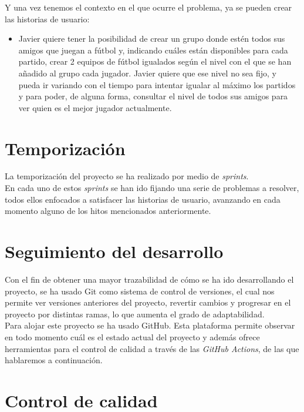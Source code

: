 Y una vez tenemos el contexto en el que ocurre el problema, ya se pueden crear las historias de usuario:

\begin{itemize}
    \item Javier quiere tener la posibilidad de crear un grupo donde estén todos sus amigos que juegan a fútbol y, indicando cuáles están disponibles para cada partido, crear 2
    equipos de fútbol igualados según el nivel con el que se han añadido al grupo cada jugador. Javier quiere que ese nivel no sea fijo, y pueda ir variando con el tiempo para intentar igualar
    al máximo los partidos y para poder, de alguna forma, consultar el nivel de todos sus amigos para ver quien es el mejor jugador actualmente.
\end{itemize}

\newpage
\section{Temporización}

La temporización del proyecto se ha realizado por medio de \textit{sprints}.\\

En cada uno de estos \textit{sprints} se han ido fijando una serie de problemas a resolver, todos ellos enfocados a satisfacer las historias de usuario, avanzando en cada momento
alguno de los hitos mencionados anteriormente.


\section{Seguimiento del desarrollo}

Con el fin de obtener una mayor trazabilidad de cómo se ha ido desarrollando el proyecto, se ha usado Git como sistema de control de versiones, el cual nos permite ver versiones anteriores
del proyecto, revertir cambios y progresar en el proyecto por distintas ramas, lo que aumenta el grado de adaptabilidad.\\

Para alojar este proyecto se ha usado GitHub. Esta plataforma permite observar en todo momento cuál es el estado actual del proyecto y además ofrece herramientas para el control de calidad
a través de las \textit{GitHub Actions}, de las que hablaremos a continuación.


\section {Control de calidad}


